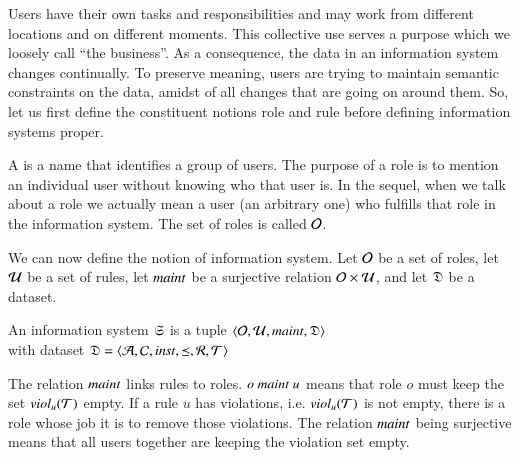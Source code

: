 \documentclass{elsarticle}
\begin{document}
	Users have their own tasks and responsibilities
	and may work from different locations and on different moments.
	This collective use serves a purpose which we loosely call ``the business''.
	As a consequence, the data in an information system changes continually.
	To preserve meaning, users are trying to maintain semantic constraints on the data,
	amidst of all changes that are going on around them.
	So, let us first define the constituent notions role and rule before defining information systems proper.

	A  is a name that identifies a group of users.
	The purpose of a role is to mention an individual user without knowing who that user is.
	In the sequel, when we talk about a role we actually mean a user (an arbitrary one) who fulfills that role in the information system.
	The set of roles is called $\mathcal{O}$.

	We can now define the notion of information system.
	Let $\mathcal{O}$ be a set of roles,
	let $\mathcal{U}$ be a set of rules, 
	let $\text{\it maint\/}$ be a surjective relation $\mathcal{O}\times\mathcal{U}$,
	and let $\mathfrak{D}$ be a dataset.
\begin{definition}
\label{def:information system}
\item An information system $\mathfrak{S}$ is a tuple $\langle\mathcal{O},\mathcal{U},\text{\it maint\/},\mathfrak{D}\rangle$\\
	with dataset $\mathfrak{D}=\langle\mathcal{A},\mathcal{C},\text{\it inst\/},\preceq,\mathcal{R},\mathcal{T}\rangle$
\end{definition}
	The relation $\text{\it maint\/}$ links rules to roles.
	$o\ \text{\it maint\/}\ u$ means that role $o$ must keep the set $\text{\it viol\/}_{u}(\mathcal{T})$ empty.
	If a rule $u$ has violations, i.e. $\text{\it viol\/}_{u}(\mathcal{T})$ is not empty, there is a role whose job it is to remove those violations.
	The relation $\text{\it maint\/}$ being surjective means that all users together are keeping the violation set empty.
\end{document}
